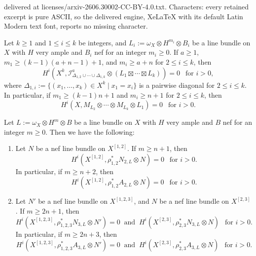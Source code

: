 \documentclass[10pt,a4paper]{amsart}
\begin{document}
delivered at licenses/arxiv-2606.30002-CC-BY-4.0.txt. Characters: every retained excerpt is pure ASCII, so the delivered engine, XeLaTeX with its default Latin Modern text font, reports no missing character.
\begin{prop}\label{prop:cohvanA}
Let $k \geq 1$ and $1 \leq i \leq k$ be integers, and $L_i:=\omega_X \otimes H^{m_i} \otimes B_i$ be a line bundle on $X$ with $H$ very ample and $B_i$ nef for an integer $m_i \geq 0$. If $a \geq 1$, $m_1 \geq (k-1)(a+n-1)+1$, and $m_i \geq a+n$ for $2 \leq i \leq k$, then  
$$
H^i(X^k, \mathscr{I}_{\Delta_{1,2} \cup \cdots \cup \Delta_{1,k}}^a \otimes (L_1 \boxtimes \cdots \boxtimes L_k))=0~~\text{ for $i > 0$},
$$
where $\Delta_{1,i}:=\{ (x_1, \ldots, x_k) \in X^k \mid x_1 = x_i\}$ is a pairwise diagonal for $2 \leq i \leq k$. In particular, if $m_1 \geq (k-1)n+1$ and $m_i \geq n+1$ for $2 \leq i \leq k$, then
$$
H^i(X, M_{L_2} \otimes \cdots \otimes M_{L_k} \otimes L_1) = 0~~\text{ for $i>0$}. 
$$
\end{prop}

\begin{prop}\label{prop:cohvanB}
Let $L:=\omega_X \otimes H^m \otimes B$ be a line bundle on $X$ with $H$ very ample and $B$ nef for an integer $m \geq 0$. Then we have the following:
\begin{enumerate}
    \item Let $N$ be a nef line bundle on $X^{[1,2]}$. If $m \geq n+1$, then 
    $$
    H^i(X^{[1,2]}, \rho_{1,2}^* N_{2,L} \otimes N)=0~~\text{ for $i>0$}.
    $$
    In particular, if $m \geq n+2$, then 
    $$
     H^i(X^{[1,2]}, \rho_{1,2}^* A_{2,L} \otimes N)=0~~\text{ for $i>0$}.
    $$
    \item Let $N'$ be a nef line bundle on $X^{[1,2,3]}$, and $N$ be a nef line bundle on $X^{[2,3]}$. If $m  \geq 2n+1$, then 
    $$
    H^i(X^{[1,2,3]}, \rho_{1,2,3}^* N_{3,L} \otimes N')=0~\text{ and }~H^i(X^{[2,3]}, \rho_{2,3}^* N_{3,L} \otimes N)~~\text{ for $i>0$}.
    $$
    In particular, if $m \geq 2n+3$, then 
    $$
    H^i(X^{[1,2,3]}, \rho_{1,2,3}^* A_{3,L} \otimes N')=0~\text{ and }~H^i(X^{[2,3]}, \rho_{2,3}^* A_{3,L} \otimes N)~~\text{ for $i>0$}.
    $$
\end{enumerate}
\end{prop}
\end{document}

